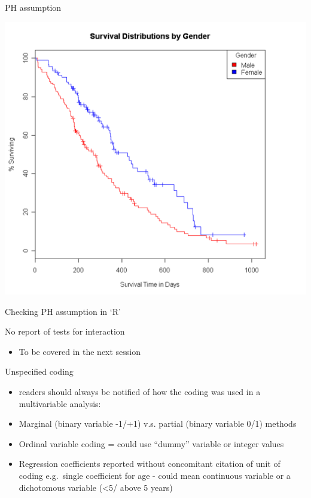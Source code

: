 \documentclass[ignorenonframetext,]{beamer}
\begin{document}
\begin{frame}{PH assumption}

\includegraphics{gender.png}

\end{frame}

\begin{frame}{Checking PH assumption in `R'}

\end{frame}

\begin{frame}{No report of tests for interaction}

\begin{itemize}
\itemsep1pt\parskip0pt
\item
  To be covered in the next session
\end{itemize}

\end{frame}

\begin{frame}{Unspecified coding}

\begin{itemize}
\itemsep1pt\parskip0pt
\item
  readers should always be notified of how the coding was used in a
  multivariable analysis:
\item
  Marginal (binary variable -1/+1) v.s. partial (binary variable 0/1)
  methods
\item
  Ordinal variable coding = could use ``dummy'' variable or integer
  values
\item
  Regression coefficients reported without concomitant citation of unit
  of coding e.g.~single coefficient for age - could mean continuous
  variable or a dichotomous variable (\textless{}5/ above 5 years)
\end{itemize}

\end{frame}
\end{document}
